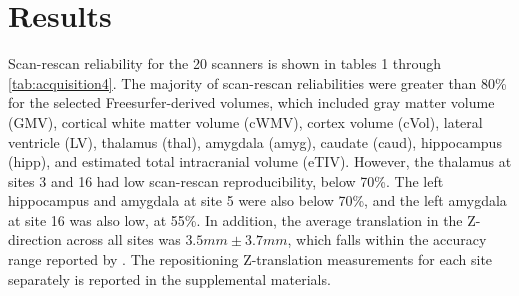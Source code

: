 \documentclass{article}
\begin{document}
\section{Results} %
Scan-rescan reliability for the 20 scanners is shown in tables 1 through \ref{tab:acquisition4}. The majority of scan-rescan reliabilities were greater than 80\% for the selected Freesurfer-derived volumes, which included gray matter volume (GMV), cortical white matter volume (cWMV), cortex volume (cVol), lateral ventricle (LV), thalamus (thal), amygdala (amyg), caudate (caud), hippocampus (hipp), and estimated total intracranial volume (eTIV). However, the thalamus at sites 3 and 16 had low scan-rescan reproducibility, below 70\%. The left hippocampus and amygdala at site 5 were also below 70\%, and the left amygdala at site 16 was also low, at 55\%. In addition, the average translation in the Z-direction across all sites was $3.5mm \pm 3.7mm$, which falls within the accuracy range reported by \cite{caramanos2010gradient}. The repositioning Z-translation measurements for each site separately is reported in the supplemental materials.
\end{document}
